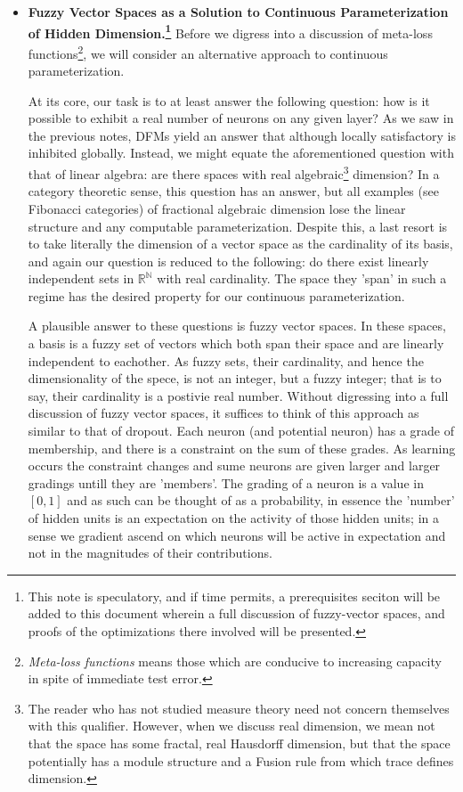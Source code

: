 \documentclass[12pt]{article}
\begin{document}
\begin{itemize}
	   \item \textbf{Fuzzy Vector Spaces as a Solution to Continuous Parameterization of Hidden Dimension.\footnote{
	   This note is speculatory, and if time permits, a prerequisites seciton will be added to this document wherein a full discussion of fuzzy-vector spaces, and proofs of the optimizations there involved will be presented.}} Before we digress into a discussion of meta-loss functions\footnote{\emph{Meta-loss functions} means those which are conducive to increasing capacity in spite of immediate test error.}, we will consider an alternative approach to continuous parameterization.
	   
	   At its core, our task is to at least answer the following question: how is it possible to exhibit a real number of neurons on any given layer? As we saw in the previous notes, DFMs yield an answer that although locally satisfactory is inhibited globally. Instead, we might equate the aforementioned question with that of linear algebra: are there spaces with real algebraic\footnote{The reader who has not studied measure theory need not concern themselves with this qualifier. However, when we discuss real dimension, we mean not that the space has some fractal, real Hausdorff dimension, but that the space potentially has a module structure and a Fusion rule from which trace defines dimension.} dimension?  In a category theoretic sense, this question has an answer, but all examples (see Fibonacci categories) of fractional algebraic dimension lose the linear structure and any computable parameterization. Despite this, a last resort is to take literally the dimension of a vector space as the cardinality of its basis, and again our question is reduced to the following: do there exist linearly independent sets in $\mathbb{R}^\mathbb{N}$ with real cardinality. The space they 'span' in such a regime has the desired property for our continuous parameterization.
	   
    	   A plausible answer to these questions is fuzzy vector spaces. In these spaces, a basis is a fuzzy set of vectors which both span their space and are linearly independent to eachother. As fuzzy sets, their cardinality, and hence the dimensionality of the spece, is not an integer, but a fuzzy integer; that is to say, their cardinality is a postivie real number. Without digressing into a full discussion of fuzzy vector spaces, it suffices to think of this approach as similar to that of dropout. Each neuron (and potential neuron) has a grade of membership, and there is a constraint on the sum of these grades. As learning occurs the constraint changes and sume neurons are given larger and larger gradings untill they are 'members'. The grading of a neuron is a value in $[0,1]$ and as such can be thought of as a probability, in essence the 'number' of hidden units is an expectation on the activity of those hidden units; in a sense we gradient ascend on which neurons will be active in expectation and not in the magnitudes of their contributions. 
    	   

\end{itemize}
\end{document}
